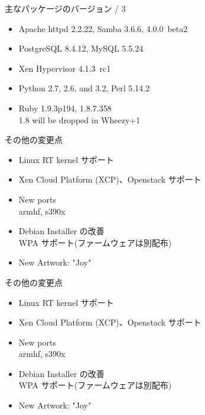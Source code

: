 \documentclass[cjk,dvipdfmx,12pt,compress,%
hyperref={bookmarks=true,bookmarksnumbered=true,bookmarksopen=false,%
  colorlinks=false,%
  pdftitle={第 66 回 関西 Debian 勉強会@KOF2012},%
  pdfauthor={佐々木洋平},%
  pdfsubject={資料},%
}]{beamer}
\begin{document}
\begin{frame}{主なパッケージのバージョン / 3}

\begin{itemize}
  \item Apache httpd 2.2.22, Samba 3.6.6, 4.0.0~beta2
  \item PostgreSQL 8.4.12, MySQL 5.5.24
  \item Xen Hypervisor 4.1.3~rc1
  \item Python 2.7, 2.6, and 3.2, Perl 5.14.2
  \item Ruby 1.9.3p194, 1.8.7.358 \\
        1.8 will be dropped in Wheezy+1
\end{itemize}

\end{frame}

\begin{frame}{その他の変更点}

\begin{itemize}
 \item Linux RT kernel サポート
 \item Xen Cloud Platform (XCP)、Openstack サポート
 \item New ports\\
  armhf, s390x
 \item Debian Installer の改善 \\
  WPA サポート(ファームウェアは別配布)
 \item  New Artwork: "Joy"
\end{itemize}

\end{frame}

\begin{frame}{その他の変更点}

\begin{itemize}
 \item Linux RT kernel サポート
 \item Xen Cloud Platform (XCP)、Openstack サポート
 \item New ports\\
  armhf, s390x
 \item Debian Installer の改善 \\
  WPA サポート(ファームウェアは別配布)
 \item  {\color{red}New Artwork: "Joy"}
\end{itemize}

\end{frame}


\end{document}
